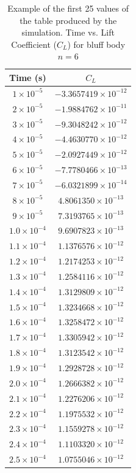 \begin{table}[H]
	\centering
	\renewcommand{\arraystretch}{1.3}
	\begin{tabular}{|c|c|}
		\hline
		\textbf{Time (s)} & \textbf{$C_L$} \\
		\hline
		$1 \times 10^{-5}$  & $-3.3657419 \times 10^{-12}$ \\
		$2 \times 10^{-5}$  & $-1.9884762 \times 10^{-11}$ \\
		$3 \times 10^{-5}$  & $-9.3048242 \times 10^{-12}$ \\
		$4 \times 10^{-5}$  & $-4.4630770 \times 10^{-12}$ \\
		$5 \times 10^{-5}$  & $-2.0927449 \times 10^{-12}$ \\
		$6 \times 10^{-5}$  & $-7.7780466 \times 10^{-13}$ \\
		$7 \times 10^{-5}$  & $-6.0321899 \times 10^{-14}$ \\
		$8 \times 10^{-5}$  & $4.8061350 \times 10^{-13}$ \\
		$9 \times 10^{-5}$  & $7.3193765 \times 10^{-13}$ \\
		$1.0 \times 10^{-4}$ & $9.6907823 \times 10^{-13}$ \\
		$1.1 \times 10^{-4}$ & $1.1376576 \times 10^{-12}$ \\
		$1.2 \times 10^{-4}$ & $1.2174253 \times 10^{-12}$ \\
		$1.3 \times 10^{-4}$ & $1.2584116 \times 10^{-12}$ \\
		$1.4 \times 10^{-4}$ & $1.3129809 \times 10^{-12}$ \\
		$1.5 \times 10^{-4}$ & $1.3234668 \times 10^{-12}$ \\
		$1.6 \times 10^{-4}$ & $1.3258472 \times 10^{-12}$ \\
		$1.7 \times 10^{-4}$ & $1.3305942 \times 10^{-12}$ \\
		$1.8 \times 10^{-4}$ & $1.3123542 \times 10^{-12}$ \\
		$1.9 \times 10^{-4}$ & $1.2928728 \times 10^{-12}$ \\
		$2.0 \times 10^{-4}$ & $1.2666382 \times 10^{-12}$ \\
		$2.1 \times 10^{-4}$ & $1.2276206 \times 10^{-12}$ \\
		$2.2 \times 10^{-4}$ & $1.1975532 \times 10^{-12}$ \\
		$2.3 \times 10^{-4}$ & $1.1559278 \times 10^{-12}$ \\
		$2.4 \times 10^{-4}$ & $1.1103320 \times 10^{-12}$ \\
		$2.5 \times 10^{-4}$ & $1.0755046 \times 10^{-12}$ \\
		\hline
	\end{tabular}
	\label{tab:6FaceClTable}
	\caption{Example of the first 25 values of the table produced by the simulation. Time vs. Lift Coefficient ($C_L$) for bluff body $n=6$}
\end{table}


